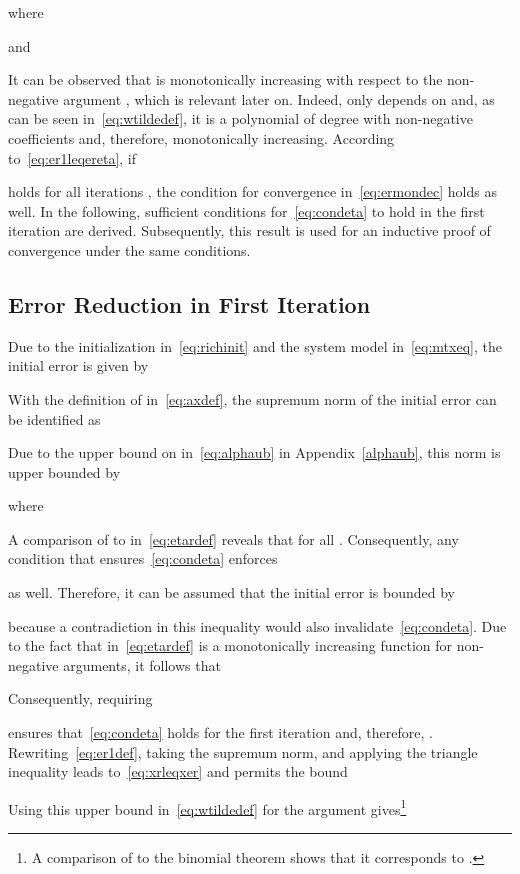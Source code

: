 \documentclass[10pt,twocolumn,twoside]{IEEEtran}
\begin{document}
where

and

It can be observed that  is monotonically
increasing with respect to the non-negative argument ,
which is relevant later on. Indeed, only
 depends on 
and, as can be seen in~\eqref{eq:wtildedef}, it is a polynomial of degree  with
non-negative coefficients and, therefore, monotonically increasing.
According to~\eqref{eq:er1leqereta}, if

holds for all iterations ,
the condition for convergence in~\eqref{eq:ermondec} holds as well. In the
following, sufficient conditions for~\eqref{eq:condeta} to hold in the
first iteration are derived. Subsequently,
this result is used for an inductive proof of convergence under the same conditions.


\subsection{Error Reduction in First Iteration}
	\label{ccderi1:base}
	
Due to the initialization in~\eqref{eq:richinit} and the system model in~\eqref{eq:mtxeq},
the initial error  is given by

With the definition of  in~\eqref{eq:axdef}, the supremum norm
of the initial error can be identified as

Due to the upper bound on  in~\eqref{eq:alphaub}
in Appendix~\ref{alphaub}, this norm is upper bounded by

where

A comparison of  to 
in~\eqref{eq:etardef} reveals that 
for all . Consequently, any condition that ensures~\eqref{eq:condeta}
enforces

as well. Therefore, it can be assumed that the initial error is bounded by

because a contradiction in this inequality would also invalidate~\eqref{eq:condeta}.
Due to the fact that  in~\eqref{eq:etardef}
is a monotonically increasing function for non-negative arguments, it follows
that

Consequently, requiring

ensures that~\eqref{eq:condeta} holds for the first
iteration and, therefore, .
Rewriting~\eqref{eq:er1def}, taking the supremum norm, and applying the
triangle inequality leads to~\eqref{eq:xrleqxer} and permits the bound

Using this upper bound in~\eqref{eq:wtildedef} for the argument 
gives\footnote{A comparison of  to the binomial theorem
shows that it corresponds to .}
\end{document}
